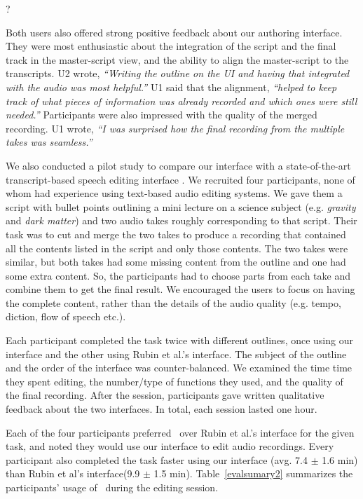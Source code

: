 ?

Both users also offered strong positive feedback about our authoring
interface. They were most enthusiastic about the integration
of the script and the final track in the master-script view,
and the ability to align the master-script to the transcripts.
U2 wrote, \textit{``Writing the outline on the UI and having
that integrated with the audio was most helpful.''}  U1 said
that the alignment, \textit{``helped to keep track of what pieces
of information was already recorded and which ones were still
needed.''} Participants were also impressed with the quality
of the merged recording. U1 wrote, \textit{``I was surprised
how the final recording from the multiple takes was seamless.''}  



We also conducted a pilot study to compare our interface with a state-of-the-art transcript-based speech editing interface \cite{rubin2013content}.  We recruited four participants, none of whom had experience using text-based audio editing systems. We gave them a script with bullet points outlining a mini lecture on a science subject (e.g. \textit{gravity} and \textit{dark matter}) and two audio takes roughly corresponding to that script. Their task was to cut and merge the two takes to produce a recording that contained all the contents listed in the script and only those contents. The two takes were similar, but both takes had some
missing content from the outline and one had some extra
content. So, the participants had to choose parts from each take and combine them to get the final result. We encouraged the users to focus on having the complete content, rather than the details of the audio quality (e.g. tempo, diction, flow of speech etc.). 

Each participant completed the task twice with different outlines, once using our interface and the other using Rubin et al.'s interface. The subject of the outline and the order of the interface was counter-balanced. We examined the time time they spent editing, the number/type of functions they used, and the quality of the final recording. After the session, participants gave written qualitative feedback about the two interfaces. In total, each session lasted one hour.
   
Each of the four participants preferred \systemname\ over Rubin et al.'s interface for the given task, and noted they would use our interface to edit audio recordings. Every participant also completed the task faster using our interface (avg. 7.4 $\pm$ 1.6 min) than Rubin et al's interface(9.9 $\pm$ 1.5 min). Table~\ref{evalsumary2} summarizes the participants' usage of \systemname\ during the editing session.


